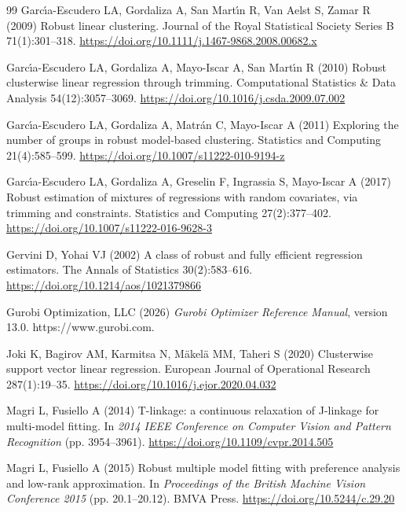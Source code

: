 \begin{thebibliography}{99}
 Garc\'{\i}a-Escudero LA, Gordaliza A, San Mart\'{\i}n R, Van Aelst S, Zamar R (2009) Robust linear clustering. Journal of the Royal Statistical Society Series B 71(1):301--318. \url{https://doi.org/10.1111/j.1467-9868.2008.00682.x}

 Garc\'{\i}a-Escudero LA, Gordaliza A, Mayo-Iscar A, San Mart\'{\i}n R (2010) Robust clusterwise linear regression through trimming. Computational Statistics \&
Data Analysis 54(12):3057--3069. \url{https://doi.org/10.1016/j.csda.2009.07.002}

 Garc\'{\i}a-Escudero LA, Gordaliza A, Matr\'{a}n C, Mayo-Iscar A (2011) Exploring the number of groups in robust model-based clustering. Statistics and Computing 21(4):585--599. \url{https://doi.org/10.1007/s11222-010-9194-z}

 Garc\'{\i}a-Escudero LA, Gordaliza A, Greselin F, Ingrassia S, Mayo-Iscar A (2017) Robust estimation of mixtures of regressions with random covariates, via trimming and constraints. Statistics and Computing 27(2):377--402. \url{https://doi.org/10.1007/s11222-016-9628-3}

 Gervini D, Yohai VJ (2002) A class
of robust and fully efficient regression estimators. The Annals of Statistics 30(2):583--616. \url{https://doi.org/10.1214/aos/1021379866}

 Gurobi Optimization, LLC (2026) \textit{Gurobi Optimizer Reference Manual}, version 13.0. https://www.gurobi.com.

 Joki K, Bagirov AM, Karmitsa N, M\"{a}kel\"{a} MM, Taheri S (2020) Clusterwise support vector linear regression. European Journal of Operational Research 287(1):19--35. \url{https://doi.org/10.1016/j.ejor.2020.04.032}

 Magri L, Fusiello A (2014) T-linkage: a continuous relaxation of J-linkage for multi-model fitting. In \textit{2014 IEEE Conference on Computer Vision and Pattern Recognition} (pp. 3954--3961). \url{https://doi.org/10.1109/cvpr.2014.505}

 Magri L, Fusiello A (2015) Robust multiple model fitting with preference analysis and low-rank approximation. In \textit{Proceedings of the British Machine Vision Conference 2015} (pp. 20.1--20.12). BMVA Press. \url{https://doi.org/10.5244/c.29.20}


\end{thebibliography}
